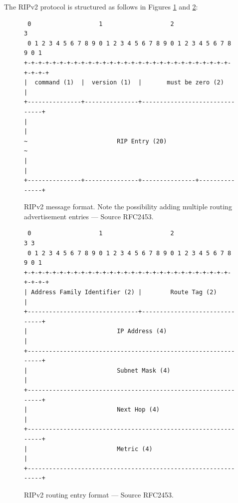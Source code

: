\documentclass[pdftex,12pt,a4paper]{article}
\begin{document}
        The RIPv2 protocol is structured as follows in Figures
        \ref{fig:ripoverview} and \ref{fig:ripentries}:
        \begin{figure}[tbh]
            \centering
            \begin{verbatim} 0                   1                   2                   3
 0 1 2 3 4 5 6 7 8 9 0 1 2 3 4 5 6 7 8 9 0 1 2 3 4 5 6 7 8 9 0 1
+-+-+-+-+-+-+-+-+-+-+-+-+-+-+-+-+-+-+-+-+-+-+-+-+-+-+-+-+-+-+-+-+
|  command (1)  |  version (1)  |       must be zero (2)        |
+---------------+---------------+-------------------------------+
|                                                               |
~                         RIP Entry (20)                        ~
|                                                               |
+---------------+---------------+---------------+---------------+\end{verbatim}
            \caption{RIPv2 message format. Note the possibility adding multiple
            routing advertisement entries --- Source RFC2453.}
            \label{fig:ripoverview}
        \end{figure}

        \begin{figure}[tbh]
            \centering
            \begin{verbatim} 0                   1                   2                   3 3
 0 1 2 3 4 5 6 7 8 9 0 1 2 3 4 5 6 7 8 9 0 1 2 3 4 5 6 7 8 9 0 1
+-+-+-+-+-+-+-+-+-+-+-+-+-+-+-+-+-+-+-+-+-+-+-+-+-+-+-+-+-+-+-+-+
| Address Family Identifier (2) |        Route Tag (2)          |
+-------------------------------+-------------------------------+
|                         IP Address (4)                        |
+---------------------------------------------------------------+
|                         Subnet Mask (4)                       |
+---------------------------------------------------------------+
|                         Next Hop (4)                          |
+---------------------------------------------------------------+
|                         Metric (4)                            |
+---------------------------------------------------------------+\end{verbatim}
            \caption{RIPv2 routing entry format --- Source RFC2453.}
            \label{fig:ripentries}
        \end{figure}
\end{document}
